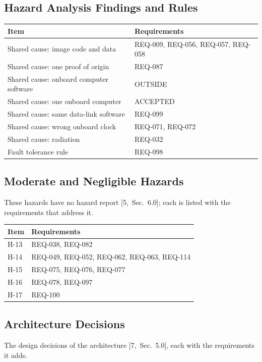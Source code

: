\documentclass[11pt,a4paper]{article}
\begin{document}
\subsection{Hazard Analysis Findings and Rules}
{\footnotesize
\begin{xltabular}{\textwidth}{@{}>{\raggedright\arraybackslash}X>{\raggedright\arraybackslash}p{6.2cm}@{}}
\toprule
Item & Requirements \\
\midrule
\endhead
Shared cause: image code and data & REQ-009, REQ-056, REQ-057, REQ-058 \\
Shared cause: one proof of origin & REQ-087 \\
Shared cause: onboard computer software & OUTSIDE \\
Shared cause: one onboard computer & ACCEPTED \\
Shared cause: same data-link software & REQ-099 \\
Shared cause: wrong onboard clock & REQ-071, REQ-072 \\
Shared cause: radiation & REQ-032 \\
Fault tolerance rule & REQ-098 \\
\bottomrule
\end{xltabular}}

\subsection{Moderate and Negligible Hazards}
These hazards have no hazard report [5,~Sec.~6.0]; each is listed with the
requirements that address it.

{\footnotesize
\begin{xltabular}{\textwidth}{@{}>{\raggedright\arraybackslash}X>{\raggedright\arraybackslash}p{6.2cm}@{}}
\toprule
Item & Requirements \\
\midrule
\endhead
H-13 & REQ-038, REQ-082 \\
H-14 & REQ-049, REQ-052, REQ-062, REQ-063, REQ-114 \\
H-15 & REQ-075, REQ-076, REQ-077 \\
H-16 & REQ-078, REQ-097 \\
H-17 & REQ-100 \\
\bottomrule
\end{xltabular}}

\subsection{Architecture Decisions}
The design decisions of the architecture [7,~Sec.~5.0], each with the
requirements it adds.
\end{document}
